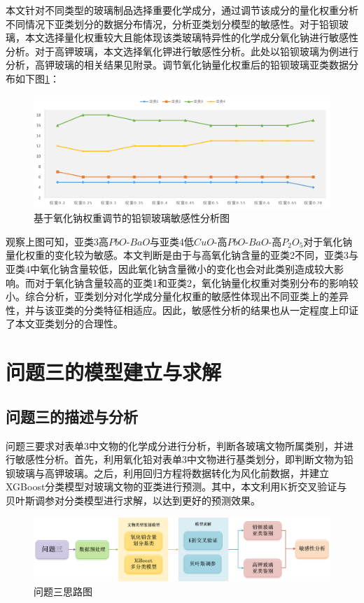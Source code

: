 \documentclass[withoutpreface,bwprint]{cumcmthesis} %
\begin{document}
本文针对不同类型的玻璃制品选择重要化学成分，通过调节该成分的量化权重分析不同情况下亚类划分的数据分布情况，分析亚类划分模型的敏感性。对于铅钡玻璃，本文选择量化权重较大且能体现该类玻璃特异性的化学成分氧化钠进行敏感性分析。对于高钾玻璃，本文选择氧化钾进行敏感性分析。此处以铅钡玻璃为例进行分析，高钾玻璃的相关结果见附录。调节氧化钠量化权重后的铅钡玻璃亚类数据分布如下图\ref{mg1}：
\begin{figure}[H]
  \centering
  \includegraphics[width=1\textwidth]{figure/敏感1}
  \caption{基于氧化钠权重调节的铅钡玻璃敏感性分析图}
  \label{mg1}
\end{figure}

观察上图可知，亚类3高$PbO$-$BaO$与亚类4低$CuO$-高$PbO$-$BaO$-高$P_2O_5$对于氧化钠量化权重的变化较为敏感。本文判断是由于与高氧化钠含量的亚类2不同，亚类3与亚类4中氧化钠含量较低，因此氧化钠含量微小的变化也会对此类别造成较大影响。而对于氧化钠含量较高的亚类1和亚类2，氧化钠量化权重对类别分布的影响较小。综合分析，亚类划分对化学成分量化权重的敏感性体现出不同亚类上的差异性，并与该亚类的分类特征相适应。因此，敏感性分析的结果也从一定程度上印证了本文亚类划分的合理性。

\section{问题三的模型建立与求解}

\subsection{问题三的描述与分析}

问题三要求对表单3中文物的化学成分进行分析，判断各玻璃文物所属类别，并进行敏感性分析。首先，利用氧化铅对表单3中文物进行基类划分，即判断文物为铅钡玻璃与高钾玻璃。之后，利用回归方程将数据转化为风化前数据，并建立XGBoost分类模型对玻璃文物的亚类进行预测。其中，本文利用K折交叉验证与 贝叶斯调参对分类模型进行求解，以达到更好的预测效果。

\begin{figure}[H]
\centering
\includegraphics[width=1\textwidth]{figure/问题三}
\caption{问题三思路图}
\end{figure}
\end{document}
